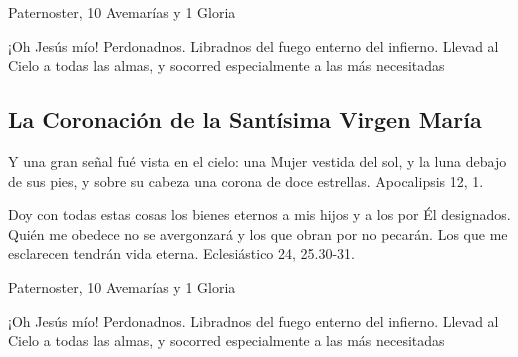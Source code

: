 \documentclass[a4paper,11pt, oneside]{report}
\begin{document}
       Paternoster, 10 Avemarías y 1 Gloria
      
      \medskip
      ¡Oh Jesús mío! Perdonadnos. Libradnos del fuego enterno del infierno. Llevad al Cielo a todas las almas, y socorred especialmente a las más 
      necesitadas

    \subsection*{La Coronación de la Santísima Virgen María}
      Y una gran señal fué vista en el cielo: una Mujer vestida del sol, y la luna debajo de sus pies, y sobre su cabeza una corona de doce estrellas.
      Apocalipsis 12, 1.

      \medskip
      Doy con todas estas cosas los bienes eternos a mis hijos y a los por Él designados. Quién me obedece no se avergonzará y los que obran por
      no pecarán. Los que me esclarecen tendrán vida eterna. Eclesiástico 24, 25.30-31.

       Paternoster, 10 Avemarías y 1 Gloria
      
      \medskip
      ¡Oh Jesús mío! Perdonadnos. Libradnos del fuego enterno del infierno. Llevad al Cielo a todas las almas, y socorred especialmente a las más 
      necesitadas
      
\end{document}
